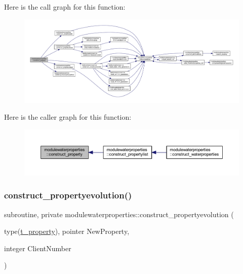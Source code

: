 Here is the call graph for this function\+:\nopagebreak
\begin{figure}[H]
\begin{center}
\leavevmode
\includegraphics[width=350pt]{namespacemodulewaterproperties_a87d8b877e916e4ea3318d7d568732d12_cgraph}
\end{center}
\end{figure}
Here is the caller graph for this function\+:\nopagebreak
\begin{figure}[H]
\begin{center}
\leavevmode
\includegraphics[width=350pt]{namespacemodulewaterproperties_a87d8b877e916e4ea3318d7d568732d12_icgraph}
\end{center}
\end{figure}
\mbox{\label{namespacemodulewaterproperties_ac9ab6b0f5ee3c2470edaceaf1ef669a7}} 
\subsubsection{\texorpdfstring{construct\+\_\+propertyevolution()}{construct\_propertyevolution()}}
{\footnotesize\ttfamily subroutine, private modulewaterproperties\+::construct\+\_\+propertyevolution (\begin{DoxyParamCaption}\item[{type(\mbox{\hyperlink{structmodulewaterproperties_1_1t__property}{t\+\_\+property}}), pointer}]{New\+Property,  }\item[{integer}]{Client\+Number }\end{DoxyParamCaption})\hspace{0.3cm}{\ttfamily [private]}}

